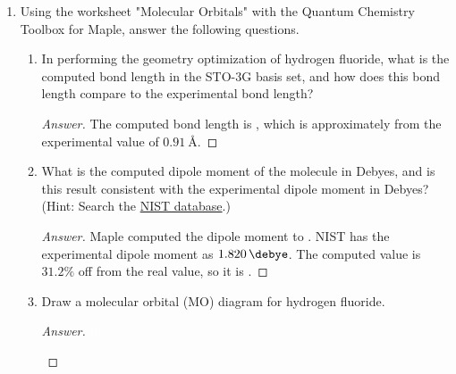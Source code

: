 \documentclass[../psets.tex]{subfiles}
\begin{document}
\begin{enumerate}
\begin{enumerate}
\begin{proof}[Answer]
\begin{align*}
                \psi_\text{e}(123456) &= 1s\alpha(1)\wedge 1s\beta(2)\wedge 2s\alpha(3)\wedge 2s\beta(4)\wedge 2p_x\beta(5)\wedge 2p_z\beta(6)\\
                \psi_\text{f}(123456) &= 1s\alpha(1)\wedge 1s\beta(2)\wedge 2s\alpha(3)\wedge 2s\beta(4)\wedge 2p_y\beta(5)\wedge 2p_z\beta(6)
            \end{align*}
        \end{proof}
    \end{enumerate}
    \item Using the worksheet "Molecular Orbitals" with the Quantum Chemistry Toolbox for Maple, answer the following questions.
    \begin{enumerate}
        \item In performing the geometry optimization of hydrogen fluoride, what is the computed bond length in the STO-3G basis set, and how does this bond length compare to the experimental bond length?
        \begin{proof}[Answer]
            The computed bond length is , which is approximately  from the experimental value of $\SI{0.91}{\angstrom}$.
        \end{proof}
        \item What is the computed dipole moment of the molecule in Debyes, and is this result consistent with the experimental dipole moment in Debyes? (Hint: Search the \href{https://cccbdb.nist.gov/exp1x.asp}{NIST database}.)
        \begin{proof}[Answer]
            Maple computed the dipole moment to . NIST has the experimental dipole moment as $\SI{1.820}{\debye}$. The computed value is $31.2\%$ off from the real value, so it is .
        \end{proof}
        \item Draw a molecular orbital (MO) diagram for hydrogen fluoride.
        \begin{proof}[Answer]
            ${\color{white}hi}$
            \begin{center}
\end{center}
\end{proof}
\end{enumerate}
\end{enumerate}
\end{document}
